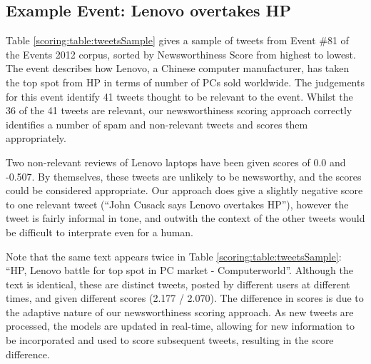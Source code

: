 \subsection{Example Event: Lenovo overtakes HP}
Table \ref{scoring:table:tweetsSample} gives a sample of tweets from Event \#81 of the Events 2012 corpus, sorted by Newsworthiness Score from highest to lowest.
The event describes how Lenovo, a Chinese computer manufacturer, has taken the top spot from HP in terms of number of PCs sold worldwide.
The judgements for this event identify 41 tweets thought to be relevant to the event.
Whilst the 36 of the 41 tweets are relevant, our newsworthiness scoring approach correctly identifies a number of spam and non-relevant tweets and scores them appropriately.

Two non-relevant reviews of Lenovo laptops have been given scores of 0.0 and -0.507. By themselves, these tweets are unlikely to be newsworthy, and the scores could be considered appropriate.
Our approach does give a slightly negative score to one relevant tweet (``John Cusack says Lenovo overtakes HP''), however the tweet is fairly informal in tone, and outwith the context of the other tweets would be difficult to interprate even for a human.

Note that the same text appears twice in Table \ref{scoring:table:tweetsSample}: ``HP, Lenovo battle for top spot in PC market - Computerworld''.
Although the text is identical, these are distinct tweets, posted by different users at different times, and given different scores (2.177 / 2.070).
The difference in scores is due to the adaptive nature of our newsworthiness scoring approach.
As new tweets are processed, the models are updated in real-time, allowing for new information to be incorporated and used to score subsequent tweets, resulting in the score difference.

